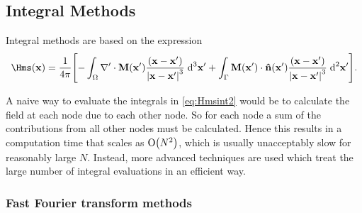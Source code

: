\subsection{Integral Methods}
\label{sec:magstat-field-calc-inte}



Integral methods are based on the expression
\begin{equation}
  \Hms(\xv) = \frac{1}{4 \pi} \bigs{ 
    - \int_\magd \nabla' \cdot \Mv(\xv') \frac{(\xv - \xv')}{\abs{\xv -\xv'}^3} \d^3 \xv'
    + \int_\boundd \Mv(\xv') \cdot \nv(\xv') \frac{(\xv - \xv')}{\abs{\xv - \xv'}^3} \d^2 \xv' }.
  \label{eq:Hmsint2}
\end{equation}

A naive way to evaluate the integrals in \cref{eq:Hmsint2} would be to calculate the field at each node due to each other node.
So for each node a sum of the contributions from all other nodes must be calculated.
Hence this results in a computation time that scales as $\text{O}{\left( N^2 \right)}$, which is usually unacceptably slow for reasonably large $N$.
Instead, more advanced techniques are used which treat the large number of integral evaluations in an efficient way.


\subsubsection{Fast Fourier transform methods}


